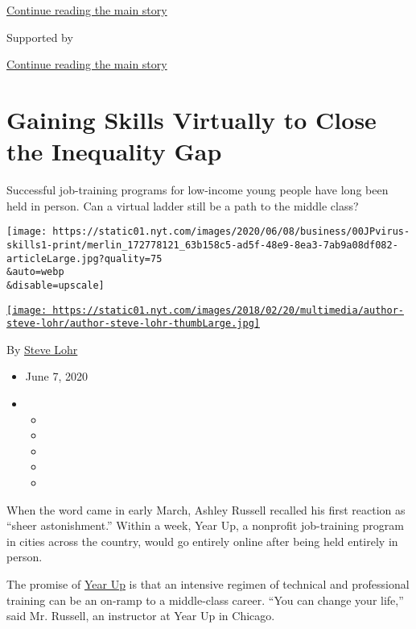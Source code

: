 \protect\hyperlink{after-top}{Continue reading the main story}

Supported by

\protect\hyperlink{after-sponsor}{Continue reading the main story}

\hypertarget{gaining-skills-virtually-to-close-the-inequality-gap}{%
\section{Gaining Skills Virtually to Close the Inequality
Gap}\label{gaining-skills-virtually-to-close-the-inequality-gap}}

Successful job-training programs for low-income young people have long
been held in person. Can a virtual ladder still be a path to the middle
class?

\texttt{[image: https://static01.nyt.com/images/2020/06/08/business/00JPvirus-skills1-print/merlin\_172778121\_63b158c5-ad5f-48e9-8ea3-7ab9a08df082-articleLarge.jpg?quality=75\\\&auto=webp\\\&disable=upscale]}

\href{https://www.nytimes.com/by/steve-lohr}{\texttt{[image: https://static01.nyt.com/images/2018/02/20/multimedia/author-steve-lohr/author-steve-lohr-thumbLarge.jpg]}}

By \href{https://www.nytimes.com/by/steve-lohr}{Steve Lohr}

\begin{itemize}
\item
  June 7, 2020
\item
  \begin{itemize}
  \item
  \item
  \item
  \item
  \item
  \end{itemize}
\end{itemize}

When the word came in early March, Ashley Russell recalled his first
reaction as ``sheer astonishment.'' Within a week, Year Up, a nonprofit
job-training program in cities across the country, would go entirely
online after being held entirely in person.

The promise of \href{https://www.yearup.org/}{Year Up} is that an
intensive regimen of technical and professional training can be an
on-ramp to a middle-class career. ``You can change your life,'' said Mr.
Russell, an instructor at Year Up in Chicago.

